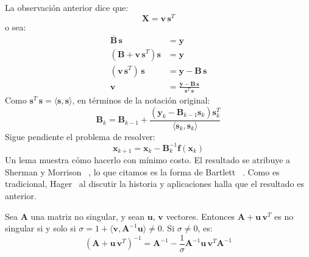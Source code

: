   La observación anterior dice que:
  \begin{equation*}
    \mathbf{X}
      = \mathbf{v} \, \mathbf{s}^T
  \end{equation*}
  o sea:
  \begin{align*}
    \overline{\mathbf{B}} \, \mathbf{s}
      &= \mathbf{y} \\
    (\mathbf{B} + \mathbf{v} \, \mathbf{s}^T) \mathbf{s}
      &= \mathbf{y} \\
    (\mathbf{v} \, \mathbf{s}^T) \, \mathbf{s}
      &= \mathbf{y} - \mathbf{B} \, \mathbf{s} \\
    \mathbf{v}
      &= \frac{\mathbf{y} - \mathbf{B} \, \mathbf{s}}
              {\mathbf{s}^T \, \mathbf{s}}
  \end{align*}
  Como \(\mathbf{s}^T \, \mathbf{s} = \langle \mathbf{s}, \mathbf{s} \rangle\),
  en términos de la notación original:
  \begin{equation}
    \label{eq:quasi-Newton-equation}
    \mathbf{B}_k
      = \mathbf{B}_{k - 1}
          + \frac{
              (\mathbf{y}_k
                 - \mathbf{B}_{k - 1} \mathbf{s}_k) \mathbf{s}_k^T
            }
            {
              \langle \mathbf{s}_k, \mathbf{s}_k \rangle
            }
  \end{equation}
  Sigue pendiente el problema de resolver:
  \begin{equation*}
    \mathbf{x}_{k + 1}
      = \mathbf{x}_k - \mathbf{B}_k^{-1} \mathbf{f}(\mathbf{x}_k)
  \end{equation*}
  Un lema muestra cómo hacerlo con mínimo costo.
  El resultado se atribuye a Sherman y Morrison~%
    \cite{sherman49:_adjust_inverse_matrix_col_row,
          sherman50:_adjust_inverse_matrix_change},
  lo que citamos es la forma de Bartlett~%
    \cite{bartlett51:_inverse_matrix_adjustment}.
  Como es tradicional,
  Hager~%
    \cite{hager89:_updating_inverse_matrix}
  al discutir la historia y aplicaciones halla que el resultado es anterior.
  \begin{lemma}
    \label{lem:Sherman-Morrison}
    Sea \(\mathbf{A}\) una matriz no singular,
    y sean \(\mathbf{u}\), \(\mathbf{v}\) vectores.
    Entonces \(\mathbf{A} + \mathbf{u} \, \mathbf{v}^T\) es no singular
    si y solo si
      \(\sigma
          = 1 + \langle \mathbf{v}, \mathbf{A}^{-1} \mathbf{u} \rangle \ne 0\).
    Si \(\sigma \ne 0\),
    es:
    \begin{equation*}
      \label{eq:Sherman-Morrison}
      (\mathbf{A} + \mathbf{u} \, \mathbf{v}^T)^{-1}
        = \mathbf{A}^{-1}
            - \frac{1}{\sigma}
                 \mathbf{A}^{-1} \mathbf{u} \, \mathbf{v}^T \mathbf{A}^{-1}
    \end{equation*}
  \end{lemma}
